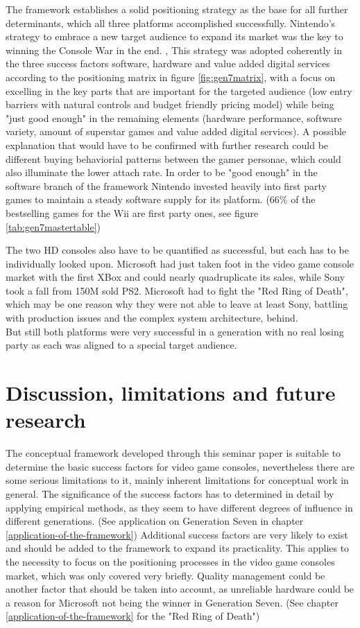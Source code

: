 \documentclass
[
    a4paper,
    11pt
]
{article}
\begin{document}
The framework establishes a solid positioning strategy as the base for all
further determinants, which all three platforms accomplished successfully. Nintendo's
strategy to embrace a new target audience to expand its market was
the key to winning the Console War in the end. \cite{Casey2006}, \cite{Carless2006}
This strategy was adopted coherently in the three success factors software, hardware
and value added digital services according to the positioning matrix in figure
\ref{fig:gen7matrix}, with a focus on excelling in the key parts that are
important for the targeted audience (low entry barriers with natural controls
and budget friendly pricing model) while being "just good enough" in the
remaining elements (hardware performance, software variety, amount of superstar games and value
added digital services). A possible explanation that would have to be
confirmed with further research could be different buying behaviorial patterns between
the gamer personae, which could also illuminate the lower attach rate. In
order to be "good enough" in the software branch of the framework Nintendo
invested heavily into first party games to maintain a steady software supply
for its platform. (66\% of the bestselling games for the Wii are first party ones,
see figure \ref{tab:gen7mastertable})

The two HD consoles also have to be quantified as successful, but each has to be individually
looked upon. Microsoft had just taken foot in the video game console market with
the first XBox and could nearly quadruplicate its sales, while Sony
took a fall from 150M sold PS2. \cite{Vgchartz.com2016} Microsoft had to fight
the "Red Ring of Death", which may be one reason why they were not able to leave
at least Sony, battling with production issues and
the complex system architecture, behind. \cite{Takahashi2008}\\
But still both platforms were very successful in a generation with no real losing
party as each was aligned to a special target audience.
%
\section{Discussion, limitations and future research}
\label{discussion-limitations-and-future-research}
%
The conceptual framework developed through this seminar paper is suitable to
determine the basic success factors for video game consoles, nevertheless
there are some serious limitations to it, mainly inherent limitations for
conceptual work in general. The significance of the success factors has to
determined in detail by applying empirical methods, as they seem to have
different degrees of influence in different generations. (See application on
Generation Seven in chapter \ref{application-of-the-framework})
Additional success factors are very likely to exist and should be added to the
framework to expand its practicality. This applies to the necessity to focus
on the positioning processes in the video game consoles market, which was only
covered very briefly. Quality management could be another factor that should be
taken into account, as unreliable hardware could be a reason for Microsoft not
being the winner in Generation Seven. (See chapter \ref{application-of-the-framework}
for the "Red Ring of Death")
\end{document}
